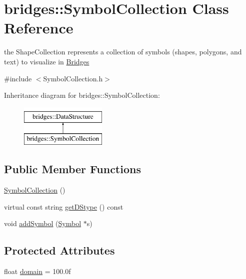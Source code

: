 \hypertarget{classbridges_1_1_symbol_collection}{}\section{bridges\+:\+:Symbol\+Collection Class Reference}
\label{classbridges_1_1_symbol_collection}


the Shape\+Collection represents a collection of symbols (shapes, polygons, and text) to visualize in \hyperlink{classbridges_1_1_bridges}{Bridges}  




{\ttfamily \#include $<$Symbol\+Collection.\+h$>$}

Inheritance diagram for bridges\+:\+:Symbol\+Collection\+:\begin{figure}[H]
\begin{center}
\leavevmode
\includegraphics[height=2.000000cm]{classbridges_1_1_symbol_collection}
\end{center}
\end{figure}
\subsection*{Public Member Functions}
\begin{DoxyCompactItemize}
\item 
\hyperlink{classbridges_1_1_symbol_collection_ae3b3dd944594e1ebac451c0557a45f80}{Symbol\+Collection} ()
\item 
virtual const string \hyperlink{classbridges_1_1_symbol_collection_afb6d2546989a2c728d64e8ecb37d9348}{get\+D\+Stype} () const 
\item 
void \hyperlink{classbridges_1_1_symbol_collection_acdc101f6651becc430e281ed967ddedf}{add\+Symbol} (\hyperlink{classbridges_1_1_symbol}{Symbol} $\ast$s)
\end{DoxyCompactItemize}
\subsection*{Protected Attributes}
\begin{DoxyCompactItemize}
\item 
float \hyperlink{classbridges_1_1_symbol_collection_a9387df86c54863524ab4779ff8458c7a}{domain} = 100.\+0f
\end{DoxyCompactItemize}


